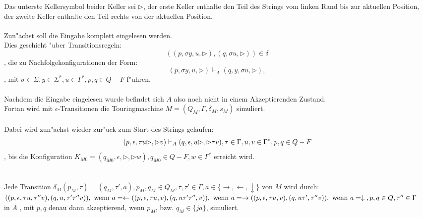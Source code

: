 \documentclass{article}
\newcommand{\da}{\downarrow}
\newcommand{\la}{\leftarrow}
\newcommand{\ra}{\rightarrow}
\newcommand{\eps}{\epsilon}
\newcommand{\s}{\rhd}
\begin{document}
\subsubsection{}
Das unterste Kellersymbol beider Keller sei $\s$, der erste Keller enthalte
    den Teil des Strings vom linken Rand bis zur aktuellen Position, der
    zweite Keller enthalte den Teil rechts von der aktuellen Position.\\
\\
Zun"achst soll die Eingabe komplett eingelesen werden.\\
Dies geschieht "uber Transitionsregeln:\[
    (
        (p, \sigma y, u, \s), 
        (q, \sigma u, \s)
    ) \in \delta
    \]
, die zu Nachfolgekonfigurationen der Form:\[
    (p, \sigma y, u, \s) 
        \vdash_A (q, y, \sigma u, \s),
    \]
, mit $
    \sigma \in \Sigma, y \in \Sigma^*, u \in \Gamma^*, 
    p,q \in Q - F$ f"uhren.\\
\\
Nachdem die Eingabe eingelesen wurde befindet sich $A$ also noch nicht
    in einem Akzeptierenden Zustand.\\
Fortan wird mit $\eps$-Transitionen die Touringmaschine 
    $M = (Q_M, \Gamma, \delta_M, s_M)$ simuliert.\\
\\
Dabei wird zun"achst wieder zur"uck zum Start des Strings gelaufen:\[
    (p,\eps,\tau u \s, \s v) \vdash_A (q,\eps,u\s,\s \tau v),
    \tau \in \Gamma, u,v \in \Gamma^*, p,q \in Q-F\\
    \]
, bis die Konfiguration 
    $K_{M0} = (q_{M0}, \eps, \s , \s w), q_{M0} \in Q-F, w \in \Gamma^*$
    erreicht wird.\\
\\
\\
Jede Transition
    $\delta_M(p_M,\tau) = (q_M, \tau', a),
    p_M,q_M \in Q_M, \tau, \tau' \in \Gamma, a \in \{\ra,\la,\da\}$
    von $M$ wird durch:\\
$\\
((p, \eps, \tau u, \tau''v), (q, u, \tau' \tau'' v))
    , \text{ wenn } a = \la\\
((p, \eps, \tau u, v), (q, u \tau' \tau'', v))
    , \text{ wenn } a = \ra\\
((p, \eps, \tau u, v), (q, u \tau', \tau'' v))
    , \text{ wenn } a = \da\\
,p,q \in Q, \tau'' \in \Gamma\\
$\\
in $A$ , mit $p,q$ denau dann akzeptierend, wenn $p_M$, bzw. $q_M \in \{ja\}$,
    simuliert.\\
\end{document}
